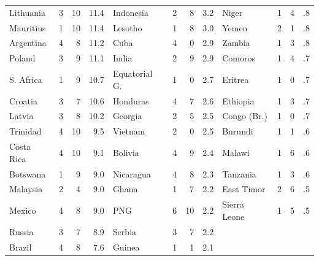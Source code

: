 \begin{table}
{\begin{ttfamily}
\begin{tabular}{|lrrr|lrrr|lrrr|}
Lithuania     & 3 & 10 &11.4 &Indonesia     & 2 &  8 & 3.2&Niger        &1& 4&   .8\\
Mauritius     & 1 & 10 &11.4 &Lesotho       & 1 &  8 & 3.0&Yemen        &2& 1&   .8\\
Argentina     & 4 &  8 &11.2 &Cuba          & 4 &  0 & 2.9&Zambia       &1& 3&   .8\\
Poland        & 3 &  9 &11.1 &India         & 2 &  9 & 2.9&Comoros      &1& 4&   .7\\
S. Africa     & 1 &  9 &10.7 &Equatorial G. & 1 &  0 & 2.7&Eritrea      &1& 0&   .7\\
Croatia       & 3 &  7 &10.6 &Honduras      & 4 &  7 & 2.6&Ethiopia     &1& 3&   .7\\
Latvia        & 3 &  8 &10.2 &Georgia       & 2 &  5 & 2.5&Congo (Br.)  &1& 0&   .7\\
Trinidad      & 4 & 10 & 9.5 &Vietnam       & 2 &  0 & 2.5&Burundi      &1& 1&   .6\\
Costa Rica    & 4 & 10 & 9.1 &Bolivia       & 4 &  9 & 2.4&Malawi       &1& 6&   .6\\
Botswana      & 1 &  9 & 9.0 &Nicaragua     & 4 &  8 & 2.3&Tanzania     &1& 3&   .6\\
Malaysia      & 2 &  4 & 9.0 &Ghana         & 1 &  7 & 2.2&East Timor   &2& 6&   .5\\
Mexico        & 4 &  8 & 9.0 &PNG           & 6 & 10 & 2.2&Sierra Leone &1& 5&   .5\\
Russia        & 3 &  7 & 8.9 &Serbia        & 3 &  7 & 2.2&             & &  &     \\
Brazil        & 4 &  8 & 7.6 &Guinea        & 1 &  1 & 2.1&& &  &     \\
\hline
\end{tabular}
\end{ttfamily}
}
\end{table}

